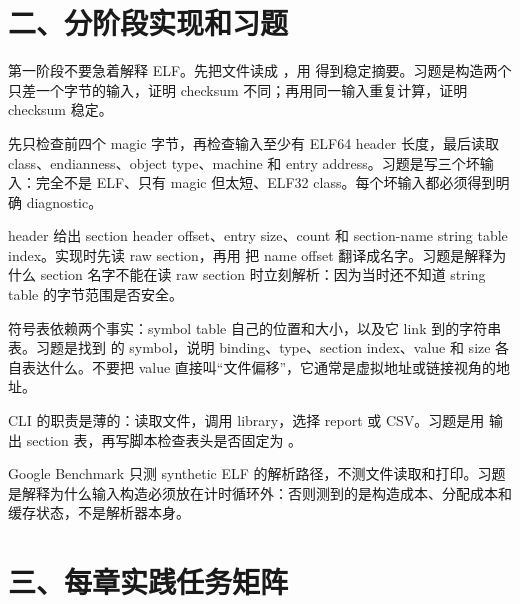 \section{二、分阶段实现和习题}

 第一阶段不要急着解释 ELF。先把文件读成 ，用  得到稳定摘要。习题是构造两个只差一个字节的输入，证明 checksum 不同；再用同一输入重复计算，证明 checksum 稳定。

 先只检查前四个 magic 字节，再检查输入至少有 ELF64 header 长度，最后读取 class、endianness、object type、machine 和 entry address。习题是写三个坏输入：完全不是 ELF、只有 magic 但太短、ELF32 class。每个坏输入都必须得到明确 diagnostic。

 header 给出 section header offset、entry size、count 和 section-name string table index。实现时先读 raw section，再用  把 name offset 翻译成名字。习题是解释为什么 section 名字不能在读 raw section 时立刻解析：因为当时还不知道 string table 的字节范围是否安全。

 符号表依赖两个事实：symbol table 自己的位置和大小，以及它 link 到的字符串表。习题是找到  的 symbol，说明 binding、type、section index、value 和 size 各自表达什么。不要把 value 直接叫“文件偏移”，它通常是虚拟地址或链接视角的地址。

 CLI 的职责是薄的：读取文件，调用 library，选择 report 或 CSV。习题是用  输出 section 表，再写脚本检查表头是否固定为 。

 Google Benchmark 只测 synthetic ELF 的解析路径，不测文件读取和打印。习题是解释为什么输入构造必须放在计时循环外：否则测到的是构造成本、分配成本和缓存状态，不是解析器本身。

\section{三、每章实践任务矩阵}

